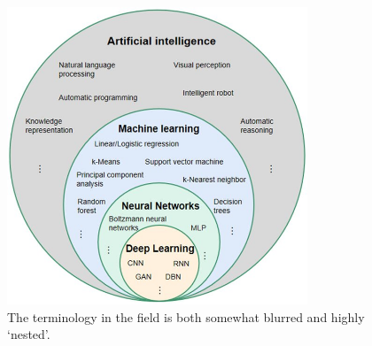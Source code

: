 \begin{figure}[ht]\centering 	\includegraphics[width=0.8\textwidth]{images/ai}
	\caption{The terminology in the field is both somewhat blurred and highly `nested'.}
	\label{fig:aiVenn}
\end{figure}

